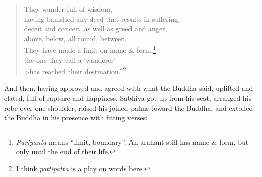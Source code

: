 \documentclass[12pt,openany]{book}%
\begin{document}
\begin{verse}
They wander full of wisdom, \\
having banished any deed that results in suffering, \\
deceit and conceit, as well as greed and anger, \\
above, below, all round, between. \\
They have made a limit on name \& form;\footnote{\textit{Pariyanta} means “limit, boundary”. An arahant still has name \& form, but only until the end of their life. } \\
the one they call a ‘wanderer’ \\>has reached their destination.”\footnote{I think \textit{pattipatta} is a play on words here. } 

%
\end{verse}

And then, having approved and agreed with what the Buddha said, uplifted and elated, full of rapture and happiness, Sabhiya got up from his seat, arranged his robe over one shoulder, raised his joined palms toward the Buddha, and extolled the Buddha in his presence with fitting verses: 
\end{document}
